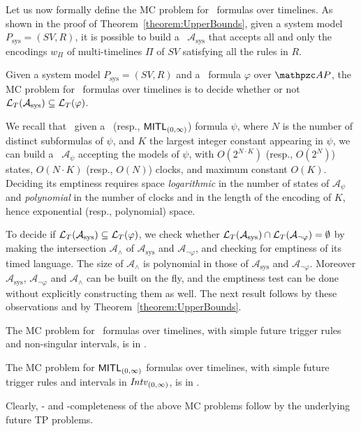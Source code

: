 Let us now formally define the MC problem for \MITL\ formulas over timelines.
As shown in the proof of Theorem~\ref{theorem:UpperBounds}, given a system model $P_\text{sys}=(SV,R)$, it is possible to build a \TA\ $\mathcal{A}_\text{sys}$ that
accepts all and only the encodings $w_\Pi$ of multi-timelines $\Pi$ of $SV$ satisfying all the rules in $R$.

\begin{definition}
Given a system model $P_\text{sys}=(SV,R)$ and a \MITL\ formula $\varphi$ over $\Prop$, the MC problem for \MITL\ formulas over timelines is to decide whether or not ${\mathcal{L}_T}(\mathcal{A}_\text{sys})\subseteq {\mathcal{L}_T}(\varphi)$.
\end{definition}

We recall that~\cite{Alur:1996} %
given a \MITL\ (resp., $\text{\sffamily MITL}_{(0,\infty)}$) formula $\psi$, where $N$ is the number of distinct subformulas of $\psi$, and $K$ the largest integer constant appearing in $\psi$, we can build a \TA\ $\mathcal{A}_\psi$ accepting the models of $\psi$, with $O(2^{N\cdot K})$ (resp., $O(2^{N})$) states, $O(N\cdot K)$ (resp., $O(N)$) clocks, and maximum constant $O(K)$. Deciding its emptiness requires
space \emph{logarithmic} in the number of states of $\mathcal{A}_\psi$ and \emph{polynomial}
in the number of clocks and in the length of the encoding of $K$, hence
exponential (resp., polynomial) space.

To decide if ${\mathcal{L}_T}(\mathcal{A}_\text{sys})\subseteq {\mathcal{L}_T}(\varphi)$, we check whether ${\mathcal{L}_T}(\mathcal{A}_\text{sys})\cap {\mathcal{L}_T}(\mathcal{A}_{\neg \varphi})= \emptyset$ by making the intersection $\mathcal{A}_\wedge$ of 
$\mathcal{A}_\text{sys}$ and $\mathcal{A}_{\neg \varphi}$, and checking for emptiness of its timed language. 
The size of $\mathcal{A}_\wedge$ is polynomial in those of $\mathcal{A}_\text{sys}$ and $ \mathcal{A}_{\neg \varphi}$.
Moreover $\mathcal{A}_\text{sys}$, $\mathcal{A}_{\neg \varphi}$ and $\mathcal{A}_\wedge$ can be built on the fly, and the emptiness test can be done without explicitly constructing them as well.
The next result follows by these observations and by Theorem~\ref{theorem:UpperBounds}.

\begin{theorem}
The MC problem for \MITL\ formulas over timelines, with simple future trigger rules and non-singular intervals, is in \EXPSPACE.

The MC problem for $\text{\sffamily MITL}_{(0,\infty)}$ formulas over timelines, with simple future trigger rules and intervals in ${\mathit{Intv}}_{(0,\infty)}$, is in \Psp.
\end{theorem}

Clearly, \EXPSPACE- and \Psp-completeness of the above MC problems follow by the underlying future TP problems.